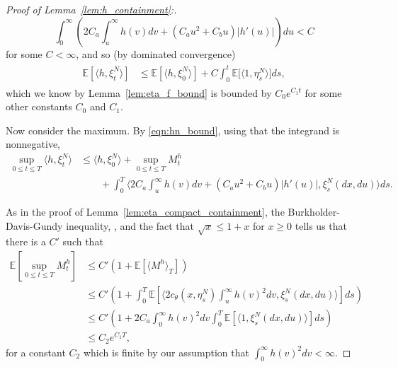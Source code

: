 \documentclass[EJP]{ejpecp} %
\newcommand{\IE}{\mathbb E}
\newcommand{\lp}{\xi}              %
\newcommand{\citet}[1]{\cite{#1}}
\begin{document}
\begin{proof}[Proof of Lemma~\ref{lem:h_containment}:]
$$        \int_0^\infty \left( 2 C_a \int_u^\infty h(v) dv
        + \left( C_a u^2 + C_b u \right) |h'(u)| \right) du
        < C
    $$
    for some $C < \infty$, and so (by dominated convergence)
    \begin{align*}
    \begin{split}
        \IE\left[ \langle h, \lp_t^N \rangle \right]
        &\le
        \IE\left[ \langle h, \lp_0^N \rangle \right]
        +
        C
        \int_0^t
        \IE\bigg[
            \big\langle
            1
            ,
            \eta_s^N \big \rangle
        \bigg]
        ds ,
    \end{split}
    \end{align*}
    which we know by Lemma~\ref{lem:eta_f_bound}
    is bounded by $C_0 e^{C_1 t}$ for some other constants $C_0$ and $C_1$.

    Now consider the maximum. By \eqref{eqn:hn_bound},
    using that the integrand is nonnegative,
    \begin{align*}
        \sup_{0 \le t \le T} \langle h, \lp_t^N \rangle
        &\le
        \langle h, \lp_0^N \rangle
        + \sup_{0 \le t \le T} M^{h}_t 
        \\ & \qquad {}
        + \int_0^T 
        \big \langle
            2 C_a \int_u^\infty h(v) dv
            + \left( C_a u^2 + C_b u \right) |h'(u)|
        ,
        \lp_s^N(dx, du) \big \rangle
        ds .
    \end{align*}

    As in the proof of Lemma~\ref{lem:eta_compact_containment},
    the Burkholder-Davis-Gundy inequality,
    \citet{barlow/jacka/yor:1986},
    and the fact that $\sqrt{x} \le 1 + x$ for $x \ge 0$
    tells us that there is a $C'$ such that
    \begin{align*}
    \IE\left[ \sup_{0 \le t \le T} M^{h}_t \right]
    & \le
        C'\left( 1 + \IE\left[ \langle M^{h} \rangle_T \right] \right)
    \\ & \le
        C' \left( 1 + \int_0^T \IE\left[
        \langle 2 c_\theta(x, \eta_s^N) \int_u^\infty h(v)^2 dv
        ,
        \lp_s^N(dx, du) \big \rangle
        \right] ds \right) 
    \\ & \le
        C' \left( 1 + 2 C_a \int_0^\infty h(v)^2 dv
        \int_0^T \IE\left[
            \langle 1 , \lp_s^N(dx, du) \big \rangle
        \right] ds \right)  
    \\ & \le
        C_2 e^{C_1 T} ,
    \end{align*}
    for a constant $C_2$ which is finite
    by our assumption that $\int_0^\infty h(v)^2 dv < \infty$.


\end{proof}
\end{document}
